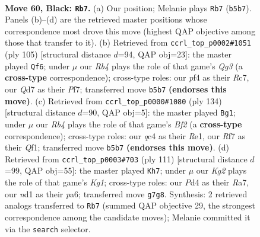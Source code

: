 \documentclass[11pt]{article}
\begin{document}
\clearpage

\begin{figure}[p]\centering
\begin{subfigure}{0.46\textwidth}\centering
\resizebox{\linewidth}{!}{%
\newchessgame
\chessboard[
  setfen={n7/3qbrk1/8/Prp2p1p/2Qp1Pp1/8/1RRBP2P/3N2K1 b - - 3 60},
  showmover=false,
  pgfstyle=straightmove, color=movearrow, markmove={b5-b7}
]}
\caption{}
\end{subfigure}\hfill
\begin{subfigure}{0.46\textwidth}\centering
\resizebox{\linewidth}{!}{%
\newchessgame
\chessboard[
  setfen={7r/2r2pk1/p2p2q1/1p2p1p1/1P2B2b/P2R1P2/2P4R/1K4Q1 b - - 6 53},
  showmover=false,
  pgfstyle=straightmove, color=movearrow, markmove={g6-f6}
]}
\caption{}
\end{subfigure}
\\[4pt]
\begin{subfigure}{0.46\textwidth}\centering
\resizebox{\linewidth}{!}{%
\newchessgame
\chessboard[
  setfen={1r3rk1/5p2/3p2p1/1PpPb2p/4P3/1P3R1P/1q3BP1/4RQ1K w - - 1 68},
  showmover=false,
  pgfstyle=straightmove, color=movearrow, markmove={f2-g1}
]}
\caption{}
\end{subfigure}\hfill
\begin{subfigure}{0.46\textwidth}\centering
\resizebox{\linewidth}{!}{%
\newchessgame
\chessboard[
  setfen={6k1/r4p2/P2q2p1/1pr4p/1QbNp3/R3P2P/5PP1/1R4K1 b - - 4 56},
  showmover=false,
  pgfstyle=straightmove, color=movearrow, markmove={g8-h7}
]}
\caption{}
\end{subfigure}
\caption{\textbf{Move 60, Black: \texttt{Rb7}.} (a) Our position; Melanie plays \texttt{Rb7} (\texttt{b5b7}). Panels (b)--(d) are the retrieved master positions whose correspondence most drove this move (highest QAP objective among those that transfer to it). (b) Retrieved from \texttt{ccrl\_top\_p0002\#1051} (ply 105) [structural distance $d$=94, QAP obj=23]: the master played \texttt{Qf6}; under $\mu$ our \emph{Rb4} plays the role of that game's \emph{Qg3} (a \textbf{cross-type} correspondence); cross-type roles: our \emph{p}f4 as their \emph{R}c7, our \emph{Q}d7 as their \emph{P}f7; transferred move \texttt{b5b7} \textbf{(endorses this move)}. (c) Retrieved from \texttt{ccrl\_top\_p0000\#1080} (ply 134) [structural distance $d$=90, QAP obj=5]: the master played \texttt{Bg1}; under $\mu$ our \emph{Rb4} plays the role of that game's \emph{Bf2} (a \textbf{cross-type} correspondence); cross-type roles: our \emph{q}c4 as their \emph{R}e1, our \emph{R}f7 as their \emph{Q}f1; transferred move \texttt{b5b7} \textbf{(endorses this move)}. (d) Retrieved from \texttt{ccrl\_top\_p0003\#703} (ply 111) [structural distance $d$=99, QAP obj=55]: the master played \texttt{Kh7}; under $\mu$ our \emph{Kg2} plays the role of that game's \emph{Kg1}; cross-type roles: our \emph{P}d4 as their \emph{R}a7, our \emph{n}d1 as their \emph{p}a6; transferred move \texttt{g7g8}. Synthesis: 2 retrieved analogs transferred to \texttt{Rb7} (summed QAP objective 29, the strongest correspondence among the candidate moves); Melanie committed it via the \texttt{search} selector.}
\label{fig:thought-m119}
\end{figure}
\end{document}
